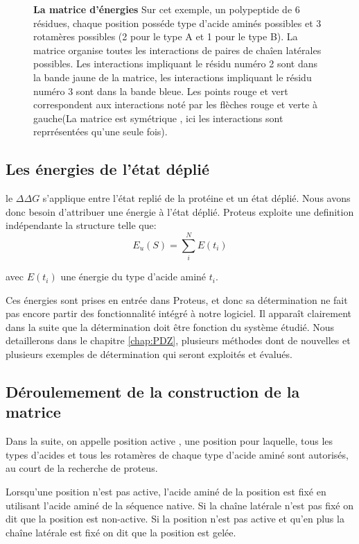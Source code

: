 \begin{figure}[!htbp]
     \caption{\textbf{La matrice d'énergies} Sur cet exemple, un polypeptide de 6 résidues, chaque position posséde type d'acide aminés possibles et 3 rotamères possibles (2 pour le type A et 1 pour le type B). La matrice organise toutes les interactions de paires de chaîen latérales possibles. Les interactions impliquant le résidu numéro 2 sont dans la bande jaune de la matrice, les interactions impliquant le résidu numéro 3 sont dans la bande bleue. Les points rouge et vert correspondent aux interactions  noté par les flèches rouge et verte à gauche(La matrice est symétrique , ici les interactions sont reprrésentées qu'une seule fois).}
\label{graph:MAt_ener}
   \end{figure}
   

\subsection{Les énergies de l'état déplié}

le $\Delta \Delta G$ s'applique entre l'état replié de la protéine et un état déplié. Nous avons donc besoin d'attribuer une énergie à l'état déplié. Proteus exploite une definition indépendante la structure telle que:
\begin{equation}
E_u(S) = \sum_i^N E(t_i)  
\end{equation}

avec $E(t_i)$ une énergie du type d'acide aminé $t_i$.

Ces énergies sont prises en entrée dans Proteus, et donc sa détermination ne fait pas encore partir des fonctionnalité intégré à notre logiciel. Il apparaît clairement dans la suite que la détermination doit être fonction du système étudié. Nous detaillerons dans le chapitre \ref{chap:PDZ}, plusieurs méthodes dont de nouvelles et plusieurs exemples de détermination qui seront exploités et évalués.


\subsection{Déroulemement de la construction de la matrice}
\label{sub:matrix}

Dans la suite, on appelle \og position active \fg, une position pour laquelle, tous les types d'acides et tous les rotamères de chaque type d'acide aminé sont autorisés, au court de la recherche de proteus.

Lorsqu'une position n'est pas active, l'acide aminé de la position est fixé en utilisant l'acide aminé de la séquence native. Si la chaîne latérale n'est pas fixé on dit que la position est \og non-active\fg. Si la position n'est pas active et qu'en plus la chaîne latérale est fixé on dit que la position est gelée.

